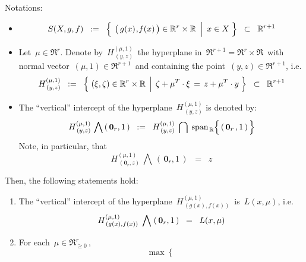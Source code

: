 \vskip 0.5cm
\begin{lemma}
\mbox{}
\vskip 0.1cm
\noindent
Notations:
\begin{itemize}
\item
	\begin{equation*}
	S(X,g,f)
	\;\; := \;\;
		\left\{\;\left.
			\left(\,g(x)\overset{{\color{white}1}}{,}f(x)\,\right) \in \Re^{r} \overset{{\color{white}.}}{\times} \Re
			\;\;\right\vert\;
				x \in X
			\;\right\}
	\;\; \subset \;\;
		\Re^{r+1}
	\end{equation*}
\item
	Let \,$\mu \in \Re^{r}$.
	Denote by \,$H^{(\mu,1)}_{\,(y,z)}$\, the hyperplane in \,$\Re^{r+1} = \Re^{r} \times \Re$\,
	with normal vector \,$(\mu,1) \in \Re^{r+1}$\, and containing the point \,$(y,z) \in \Re^{r+1}$, i.e.
	\begin{equation*}
	H^{(\mu,1)}_{\,(y,z)}
	\;\; := \;\;
		\left\{\,\left.
			(\xi,\zeta) \in \Re^{r}\times\overset{{\color{white}.}}{\Re}
			\,\;\right\vert\;
			\zeta + \mu^{T} \cdot \xi \,=\,  z + \mu^{T} \cdot y
			\;\right\}
	\;\; \subset \;\;
		\Re^{r+1}
	\end{equation*}
\item
	The ``vertical'' intercept of the hyperplane \,$H^{(\mu,1)}_{\,(y,z)}$ is denoted by:
	\begin{equation*}
	H^{(\mu,1)}_{\,(y,z)} \,\bigwedge\, (\,\mathbf{0}_{r},1\,)
	\;\; := \;\;
		H^{(\mu,1)}_{\,(y,z)}
			\;\bigcap\;
			\span_{\,\Re}\!\left\{\,\overset{{\color{white}.}}{(\,\mathbf{0}_{r}\,,1\,)}\,\right\}
	\end{equation*}
	Note, in particular, that
	\begin{equation*}
	H^{(\mu,1)}_{\,(\mathbf{0}_{r},z)} \,\bigwedge\, (\,\mathbf{0}_{r},1\,)
	\;\; = \;\;
		z
	\end{equation*}
\end{itemize}
Then, the following statements hold:
\begin{enumerate}
\item
	The ``vertical'' intercept of the hyperplane \,$H^{(\mu,1)}_{\,(g(x),f(x))}$\, is \,$L(x,\mu)$, i.e.
	\begin{equation*}
	H^{(\mu,1)}_{\,(g(x),f(x))} \;\bigwedge\; (\,\mathbf{0}_{r},1\,)
	\;\; = \;\;
		\overset{{\color{white}.}}{L}(x,\mu)
	\end{equation*}
\item
	For each \,$\mu \in \Re_{\geq 0}^{r}$\,,
	\begin{equation*}
	\max\left\{\;

\end{equation*}
\end{enumerate}
\end{lemma}
